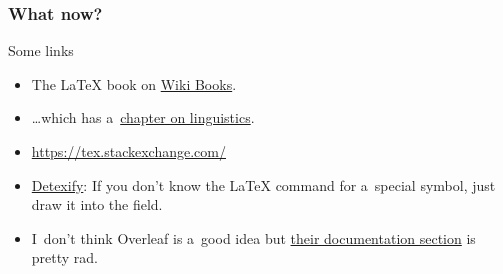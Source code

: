 \documentclass[a4paper,12pt]{beamer}
\begin{document}
\begin{frame}
  \frametitle{What now?}

  \begin{block}{Some links}
    \begin{itemize}
      \item The \LaTeX{} book on \href{https://en.wikibooks.org/wiki/LaTeX}{Wiki Books}.
      \item \dots{}which has a~\href{https://en.wikibooks.org/wiki/LaTeX/Linguistics}{chapter on linguistics}.
      \item \url{https://tex.stackexchange.com/}
      \item \href{https://detexify.kirelabs.org/classify.html}{Detexify}:
        If you don't know the \LaTeX{} command for a~special symbol, just draw
        it into the field.
      \item I~don't think Overleaf is a~good idea but
        \href{https://www.overleaf.com/learn}{their documentation section}
        is pretty rad.
    \end{itemize}
  \end{block}
\end{frame}
\end{document}
